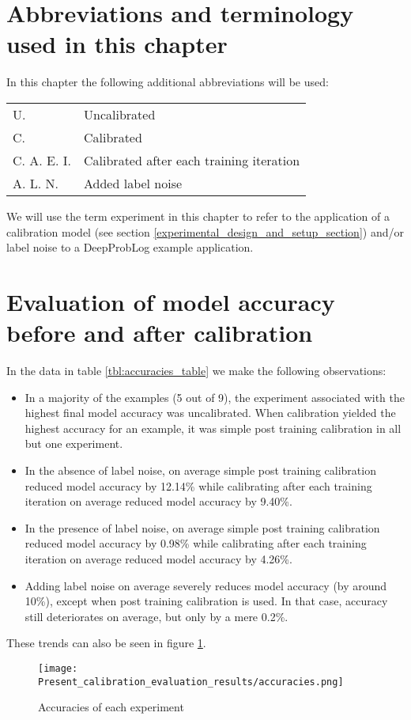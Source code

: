 \section{Abbreviations and terminology used in this chapter}
In this chapter the following additional abbreviations will be used:
\begin{flushleft}
  \renewcommand{\arraystretch}{1.1}
  \begin{tabularx}{\textwidth}{@{}p{18mm}X@{}}
  U. & Uncalibrated \\
  C. & Calibrated \\
  C. A. E. I. & Calibrated after each training iteration \\
  A. L. N. & Added label noise
  \end{tabularx}
\end{flushleft}

We will use the term experiment in this chapter to refer to the application of a calibration model (see section \ref{experimental_design_and_setup_section}) and/or label noise to a DeepProbLog example application.

\section{Evaluation of model accuracy before and after calibration}
In the data in table \ref{tbl:accuracies_table} we make the following observations:
\begin{itemize}
  \item In a majority of the examples (5 out of 9), the experiment associated with the highest final model accuracy was uncalibrated. When calibration yielded the highest accuracy for an example, it was simple post training calibration in all but one experiment.
  \item In the absence of label noise, on average simple post training calibration reduced model accuracy by 12.14\% while calibrating after each training iteration on average reduced model accuracy by 9.40\%.
  \item In the presence of label noise, on average simple post training calibration reduced model accuracy by 0.98\% while calibrating after each training iteration on average reduced model accuracy by 4.26\%.
  \item Adding label noise on average severely reduces model accuracy (by around 10\%), except when post training calibration is used. In that case, accuracy still deteriorates on average, but only by a mere 0.2\%.
\end{itemize}
These trends can also be seen in figure \ref{fig:accuracies}.

\begin{figure}[htbp!]
  \centering
  \texttt{[image: Present\_calibration\_evaluation\_results/accuracies.png]}
  \caption[Accuracies of each experiment]{Accuracies of each experiment}
  \label{fig:accuracies}
\end{figure}
\newpage

